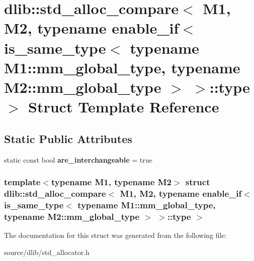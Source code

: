 \hypertarget{structdlib_1_1std__alloc__compare_3_01M1_00_01M2_00_01typename_01enable__if_3_01is__same__type_3982ed367adf685c0833f1e72cac3711f}{
\section{dlib::std\_\-alloc\_\-compare$<$ M1, M2, typename enable\_\-if$<$ is\_\-same\_\-type$<$ typename M1::mm\_\-global\_\-type, typename M2::mm\_\-global\_\-type $>$ $>$::type $>$ Struct Template Reference}
\label{structdlib_1_1std__alloc__compare_3_01M1_00_01M2_00_01typename_01enable__if_3_01is__same__type_3982ed367adf685c0833f1e72cac3711f}
}
\subsection*{Static Public Attributes}
\begin{DoxyCompactItemize}
\item 
\hypertarget{structdlib_1_1std__alloc__compare_3_01M1_00_01M2_00_01typename_01enable__if_3_01is__same__type_3982ed367adf685c0833f1e72cac3711f_acb2160f9ae7aea0af12b5c62ea3ed897}{
static const bool {\bfseries are\_\-interchangeable} = true}
\label{structdlib_1_1std__alloc__compare_3_01M1_00_01M2_00_01typename_01enable__if_3_01is__same__type_3982ed367adf685c0833f1e72cac3711f_acb2160f9ae7aea0af12b5c62ea3ed897}

\end{DoxyCompactItemize}
\subsubsection*{template$<$typename M1, typename M2$>$ struct dlib::std\_\-alloc\_\-compare$<$ M1, M2, typename enable\_\-if$<$ is\_\-same\_\-type$<$ typename M1::mm\_\-global\_\-type, typename M2::mm\_\-global\_\-type $>$ $>$::type $>$}



The documentation for this struct was generated from the following file:\begin{DoxyCompactItemize}
\item 
source/dlib/std\_\-allocator.h\end{DoxyCompactItemize}

